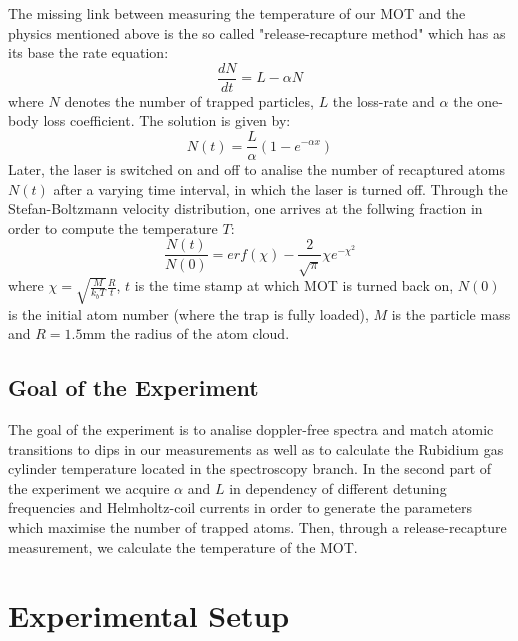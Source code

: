 \documentclass[12pt, a4paper]{article}
\begin{document}
The missing link between measuring the temperature of our MOT and the physics mentioned above is the so called "release-recapture method" which has as its base the rate equation:
\begin{equation}
\frac{dN}{dt} = L - \alpha N
\end{equation}
where $N$ denotes the number of trapped particles, $L$ the loss-rate and $\alpha$ the one-body loss coefficient. The solution is given by:
\begin{equation}
N(t) = \frac{L}{\alpha}(1-e^{-\alpha x})
\end{equation}
Later, the laser is switched on and off to analise the number of recaptured atoms $N(t)$ after a varying time interval, in which the laser is turned off.
Through the Stefan-Boltzmann velocity distribution, one arrives at the follwing fraction in order to compute the temperature $T$:
\begin{equation}
\frac{N(t)}{N(0)} = erf(\chi) - \frac{2}{\sqrt{\pi}} \chi e^{-\chi ^2}
\end{equation}
where $\chi = \sqrt{\frac{M}{k_{b} T}}\frac{R}{t}$, $t$ is the time stamp at which MOT is turned back on, $N(0)$ is the initial atom number (where the trap is fully loaded), $M$ is the particle mass and $R=1.5$mm the radius of the atom cloud. \cite{script}


\subsection{Goal of the Experiment}
The goal of the experiment is to analise doppler-free spectra and match atomic transitions to dips in our measurements as well as to calculate the Rubidium gas cylinder temperature located in the spectroscopy branch. In the second part of the experiment we acquire $\alpha$ and $L$ in dependency of different detuning frequencies and Helmholtz-coil currents in order to generate the parameters which maximise the number of trapped atoms. Then, through a release-recapture measurement, we calculate the temperature of the MOT.


\section{Experimental Setup}
\end{document}

